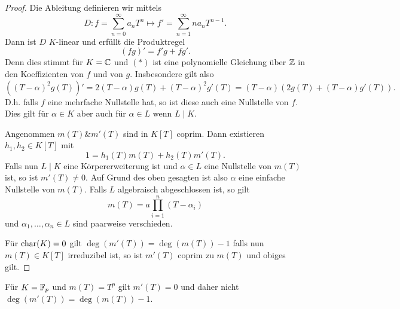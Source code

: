 \begin{proof}
	Die Ableitung definieren wir mittels
	\[
	D: f = \sum_{n=0}^{\infty} a_{n} T^{n} \mapsto f' = \sum_{n=1}^{\infty} n a_{n} T^{n-1}
	.\] 
	Dann ist $D$ $K$-linear und erfüllt die Produktregel
	\[
		(f g)' = f' g + f g' \tag{$*$}
	.\] 
	Denn dies stimmt für $K = \mathbb{C}$ und $(*)$ ist eine polynomielle Gleichung über $\mathbb{Z}$ in den Koeffizienten von $f$ und von $g$.
	Insbesondere gilt also
	\[
		((T-\alpha)^2 g(T))' = 2 (T-\alpha) g(T) + (T-\alpha)^2 g'(T) = (T-\alpha) (2 g(T) + (T-\alpha) g'(T))
	.\] 
	D.h. falls $f$ eine mehrfache Nullstelle hat, so ist diese auch eine Nullstelle von $f$.
	Dies gilt für $\alpha \in K$ aber auch für $\alpha \in L$ wenn $L \mid K$.

	Angenommen $m(T) \& m'(T)$ sind in $K[T]$ coprim. Dann existieren $h_1,h_2 \in K[T]$ mit
	\[
		1 = h_1(T) m(T) + h_2(T) m'(T)
	.\] 
	Falls nun $L \mid K$ eine Körpererweiterung ist und $\alpha \in L$ eine Nullstelle von $m(T)$ ist,
	so ist $m'(T) \neq 0$. Auf Grund des oben gesagten ist also $\alpha$ eine einfache Nullstelle von $m(T)$.
	Falls $L$ algebraisch abgeschlossen ist, so gilt
	\[
		m(T) = a \prod_{i=1}^{n} (T-\alpha_{i})
	\] 
	und $\alpha_{1},\ldots, \alpha_{n} \in L$ sind paarweise verschieden.

	Für $\operatorname{char}(K) = 0$ gilt $\deg(m'(T)) = \deg(m(T)) - 1$ falls nun $m(T) \in K[T]$ irreduzibel ist, so ist $m'(T)$ coprim zu $m(T)$ und obiges gilt.
\end{proof}

\begin{remark}
	 Für $K = \mathbb{F}_{p}$ und $m(T) = T^{p}$ gilt $m'(T) = 0$ und daher nicht $\deg(m'(T)) = \deg(m(T)) -1$.
\end{remark}

